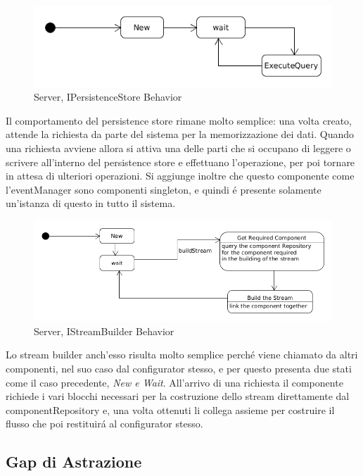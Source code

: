 \begin{figure}[h]
\centering
\includegraphics[width=\textwidth]{Figures/LogicArchitecture/Server/IPersistenceStoreBehavior}
\caption{Server, IPersistenceStore Behavior}
\end{figure}

Il comportamento del persistence store rimane molto semplice: una volta creato, attende la richiesta da parte del sistema per la memorizzazione dei dati.
Quando una richiesta avviene allora si attiva una delle parti che si occupano di leggere o scrivere all'interno del persistence store e effettuano l'operazione, per poi tornare in attesa di ulteriori operazioni. Si aggiunge inoltre che questo componente come l'eventManager sono componenti singleton, e quindi \'e presente solamente un'istanza di questo in tutto il sistema.

\begin{figure}[h]
\centering
\includegraphics[width=\textwidth]{Figures/LogicArchitecture/Server/IStreamBuiderBehavior}
\caption{Server, IStreamBuilder Behavior}
\end{figure}

Lo stream builder anch'esso risulta molto semplice perch\'e viene chiamato da altri componenti, nel suo caso dal configurator stesso, e per questo presenta due stati come il caso precedente, \textit{New e Wait}. All'arrivo di una richiesta il componente richiede i vari blocchi necessari per la costruzione dello stream direttamente dal componentRepository e, una volta ottenuti li collega assieme per costruire il flusso che poi restituir\'a al configurator stesso.

\subsection{Gap di Astrazione}

